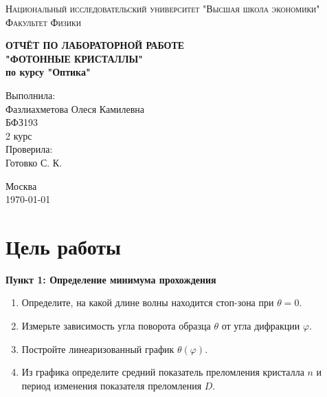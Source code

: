 \documentclass[a4paper, 12pt]{article}
\renewcommand{\phi}{\varphi} %
\begin{document}
\begin{titlepage}
\begin{center}
\textsc{Национальный исследовательский университет "Высшая школа экономики"\\[5mm]
Факультет Физики}

\vfill

\textbf{ОТЧЁТ ПО ЛАБОРАТОРНОЙ РАБОТЕ \\[3mm]
"ФОТОННЫЕ КРИСТАЛЛЫ"\\[3mm]
по курсу "Оптика"
\\[20mm]
}
\end{center}

\hfill
\begin{minipage}{.5\textwidth}
Выполнила:\\[2mm] 
Фазлиахметова Олеся Камилевна\\
БФЗ193\\
2 курс\\[5mm]

Проверила:\\[2mm] 
Готовко С. К. 
\end{minipage}%
\vfill
\begin{center}
 Москва\\
 \today
\end{center}
\end{titlepage}



\tableofcontents

\newpage

	\section{Цель работы}


\textbf{Пункт 1: Определение минимума прохождения}
	\begin{enumerate}
\item Определите, на какой длине волны находится стоп-зона при $\theta=0$.
\item  Измерьте зависимость угла поворота образца $\theta$ от угла дифракции $\phi$.
\item  Постройте линеаризованный график $\theta(\phi)$.
\item  Из графика определите средний показатель преломления кристалла $n$ и период изменения показателя преломления $D$.
	\end{enumerate}
\end{document}
